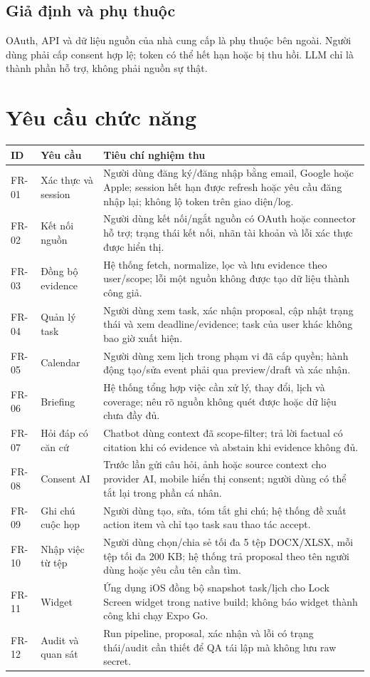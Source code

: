 \documentclass[11pt,a4paper]{article}
\begin{document}
\subsection{Giả định và phụ thuộc}
OAuth, API và dữ liệu nguồn của nhà cung cấp là phụ thuộc bên ngoài. Người dùng phải cấp consent hợp lệ; token có thể hết hạn hoặc bị thu hồi. LLM chỉ là thành phần hỗ trợ, không phải nguồn sự thật.

\section{Yêu cầu chức năng}
\begin{longtable}{p{1.7cm}p{4cm}p{8.3cm}}
\toprule ID & Yêu cầu & Tiêu chí nghiệm thu \\ \midrule\endhead
FR-01 & Xác thực và session & Người dùng đăng ký/đăng nhập bằng email, Google hoặc Apple; session hết hạn được refresh hoặc yêu cầu đăng nhập lại; không lộ token trên giao diện/log. \\
FR-02 & Kết nối nguồn & Người dùng kết nối/ngắt nguồn có OAuth hoặc connector hỗ trợ; trạng thái kết nối, nhãn tài khoản và lỗi xác thực được hiển thị. \\
FR-03 & Đồng bộ evidence & Hệ thống fetch, normalize, lọc và lưu evidence theo user/scope; lỗi một nguồn không được tạo dữ liệu thành công giả. \\
FR-04 & Quản lý task & Người dùng xem task, xác nhận proposal, cập nhật trạng thái và xem deadline/evidence; task của user khác không bao giờ xuất hiện. \\
FR-05 & Calendar & Người dùng xem lịch trong phạm vi đã cấp quyền; hành động tạo/sửa event phải qua preview/draft và xác nhận. \\
FR-06 & Briefing & Hệ thống tổng hợp việc cần xử lý, thay đổi, lịch và coverage; nêu rõ nguồn không quét được hoặc dữ liệu chưa đầy đủ. \\
FR-07 & Hỏi đáp có căn cứ & Chatbot dùng context đã scope-filter; trả lời factual có citation khi có evidence và abstain khi evidence không đủ. \\
FR-08 & Consent AI & Trước lần gửi câu hỏi, ảnh hoặc source context cho provider AI, mobile hiển thị consent; người dùng có thể tắt lại trong phần cá nhân. \\
FR-09 & Ghi chú cuộc họp & Người dùng tạo, sửa, tóm tắt ghi chú; hệ thống đề xuất action item và chỉ tạo task sau thao tác accept. \\
FR-10 & Nhập việc từ tệp & Người dùng chọn/chia sẻ tối đa 5 tệp DOCX/XLSX, mỗi tệp tối đa 200 KB; hệ thống trả proposal theo tên người dùng hoặc yêu cầu tên cần tìm. \\
FR-11 & Widget & Ứng dụng iOS đồng bộ snapshot task/lịch cho Lock Screen widget trong native build; không báo widget thành công khi chạy Expo Go. \\
FR-12 & Audit và quan sát & Run pipeline, proposal, xác nhận và lỗi có trạng thái/audit cần thiết để QA tái lập mà không lưu raw secret. \\
\bottomrule
\end{longtable}
\end{document}
